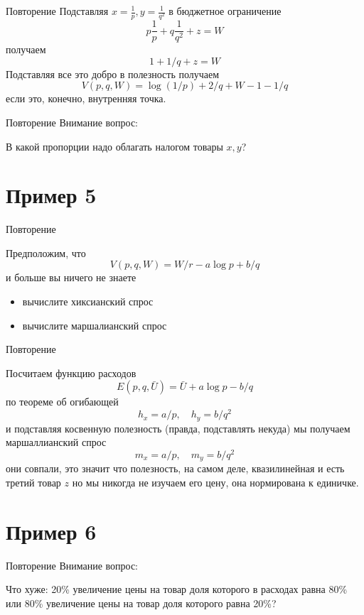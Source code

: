 \documentclass{beamer}
\begin{document}
\begin{frame}{Повторение}
Подставляя $x = \frac{1}{p}, y = \frac{1}{q^2}$ в бюджетное ограничение
$$ p\frac{1}{p} + q\frac{1}{q^2} + z = W $$
получаем
$$ 1 + 1/q + z = W$$
Подставляя все это добро в полезность получаем
$$ V(p,q,W) = \log(1/p) + 2/q + W - 1 - 1/q$$
если это, конечно, внутренняя точка.
\end{frame}

\begin{frame}{Повторение}
Внимание вопрос:

В какой пропорции надо облагать налогом товары $x,y$?
\end{frame}

\section{Пример 5}

\begin{frame}{Повторение}

Предположим, что
$$ V(p,q,W) = W/r - a\log p + b/q $$
и больше вы ничего не знаете
\begin{itemize}
  \item вычислите хиксианский спрос
  \item вычислите маршалианский спрос
\end{itemize}

\end{frame}

\begin{frame}{Повторение}

Посчитаем функцию расходов
$$ E(p,q,\bar U) = \bar U + a\log p - b/q $$
по теореме об огибающей
$$ h_x = a/p, \quad h_y = b/q^2$$
и подставляя косвенную полезность (правда, подставлять некуда) мы получаем маршаллианский спрос
$$ m_x = a/p, \quad m_y = b/q^2$$
они совпали, это значит что полезность, на самом деле, квазилинейная и есть третий товар $z$ но мы никогда не изучаем его цену, она нормирована к единичке.
\end{frame}

\section{Пример 6}

\begin{frame}{Повторение}
Внимание вопрос:

Что хуже: 20\% увеличение цены на товар доля которого в расходах равна 80\% или 80\% увеличение цены на товар доля которого равна 20\%?
\end{frame}
\end{document}
